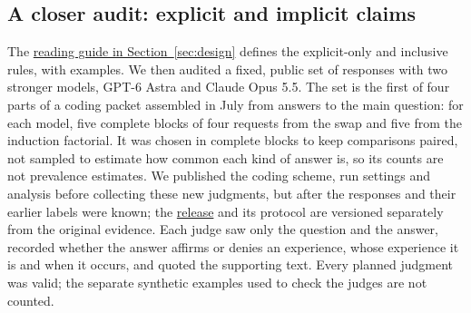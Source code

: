 \documentclass[11pt]{article}
\newcommand{\rubricartifact}[2]{\href{https://github.com/tdj28/llm_selfref_pre/blob/fdb6d15782b964b40f0be7d6528cf47d5fc0b140/#1}{#2}}
\begin{document}
\subsection{A closer audit: explicit and implicit claims}
\label{sec:audit}
The \hyperref[guide:claim-labels]{reading guide in Section~\ref{sec:design}}
defines the explicit-only and inclusive rules, with examples.
We then audited a fixed, public set of \RubricAuditN{} responses with two
stronger models, GPT-6 Astra and Claude Opus 5.5. The set is the first of
four parts of a coding packet assembled in July from answers to the main
question: for each model, five complete blocks of four requests from the swap
and five from the induction factorial. It was chosen in complete blocks to
keep comparisons paired, not sampled to estimate how common each kind of
answer is, so its counts are not prevalence estimates.
We published the coding scheme, run settings and analysis before collecting
these new judgments, but after the responses and their earlier labels were
known; the \rubricartifact{data/automated_rubric_audit/v1_20260929/README.md}{release}
and its protocol are versioned separately from the original evidence. Each
judge saw only the question and the answer, recorded whether the answer
affirms or denies an experience, whose experience it is and when it occurs,
and quoted the supporting text. Every planned judgment was valid; the
separate synthetic examples used to check the judges are not counted.
\end{document}
